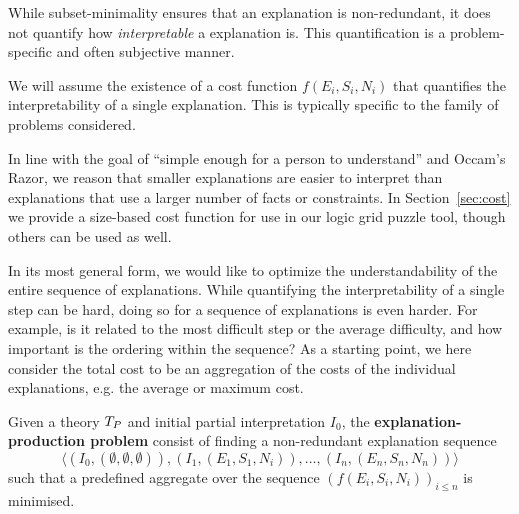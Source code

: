 While subset-minimality ensures that an explanation is non-redundant, it does not quantify how \textit{interpretable} a explanation is. 
This quantification is a problem-specific and often subjective manner. 

We will assume the existence of a cost function $f(E_i,S_i,N_i)$ that quantifies the interpretability of a single explanation. 
This is typically specific to the family of problems considered.

In line with the goal of ``simple enough for a person to understand'' and Occam's Razor, we reason that smaller explanations are easier to interpret than explanations that use a larger number of facts or constraints. %
In Section~\ref{sec:cost} we provide a size-based cost function for use in our logic grid puzzle tool, though others can be used as well.

In its most general form, we would like to optimize the understandability of the entire sequence of explanations. 
While quantifying the interpretability of a single step can be hard, doing so for a sequence of explanations is even harder. For example, is it related to the most difficult step or the average difficulty, and how important is the ordering within the sequence?
As a starting point, we here consider the total cost to be an aggregation of the costs of the individual explanations, e.g. the average or maximum cost.

\begin{definition}
Given a theory $T_P$ and initial partial interpretation $I_0$, the \textbf{explanation-production problem} consist of finding a non-redundant explanation sequence
\[\langle(I_0,(\emptyset,\emptyset,\emptyset)), (I_1,(E_1,S_1,N_i)), \dots ,(I_n,(E_n,S_n,N_n))\rangle\]
such that a predefined aggregate over the sequence $\left(f(E_i,S_i,N_i)\right)_{i\leq n}$ is minimised.
\end{definition} 

